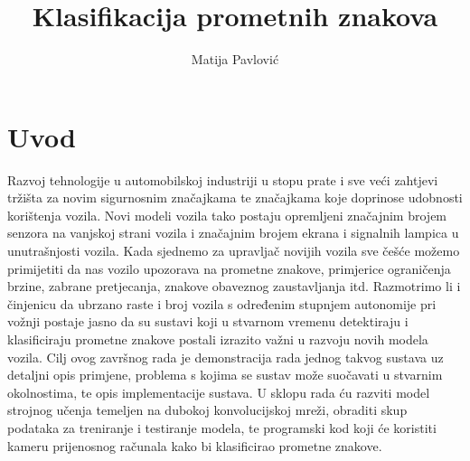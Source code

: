 \documentclass[times, utf8, zavrsni]{fer}
\begin{document}

\title{Klasifikacija prometnih znakova}

\author{Matija Pavlović}

\maketitle



\zahvala{}

\tableofcontents

\chapter{Uvod}
Razvoj tehnologije u automobilskoj industriji u stopu prate i sve veći zahtjevi tržišta za novim sigurnosnim značajkama te značajkama koje doprinose udobnosti korištenja vozila. Novi modeli vozila tako postaju opremljeni značajnim brojem senzora na vanjskoj strani vozila i značajnim brojem ekrana i signalnih lampica u unutrašnjosti vozila. Kada sjednemo za upravljač novijih vozila sve češće možemo primijetiti da nas vozilo upozorava na prometne znakove, primjerice ograničenja brzine, zabrane pretjecanja, znakove obaveznog zaustavljanja itd. Razmotrimo li i činjenicu da ubrzano raste i broj vozila s određenim stupnjem autonomije pri vožnji postaje jasno da su sustavi koji u stvarnom vremenu detektiraju i klasificiraju prometne znakove postali izrazito važni u razvoju novih modela vozila. Cilj ovog završnog rada je demonstracija rada jednog takvog sustava uz detaljni opis primjene, problema s kojima se sustav može suočavati u stvarnim okolnostima, te opis implementacije sustava. U sklopu rada ću razviti model strojnog učenja temeljen na dubokoj konvolucijskoj mreži, obraditi skup podataka za treniranje i testiranje modela, te programski kod koji će koristiti kameru prijenosnog računala kako bi klasificirao prometne znakove.
\end{document}
